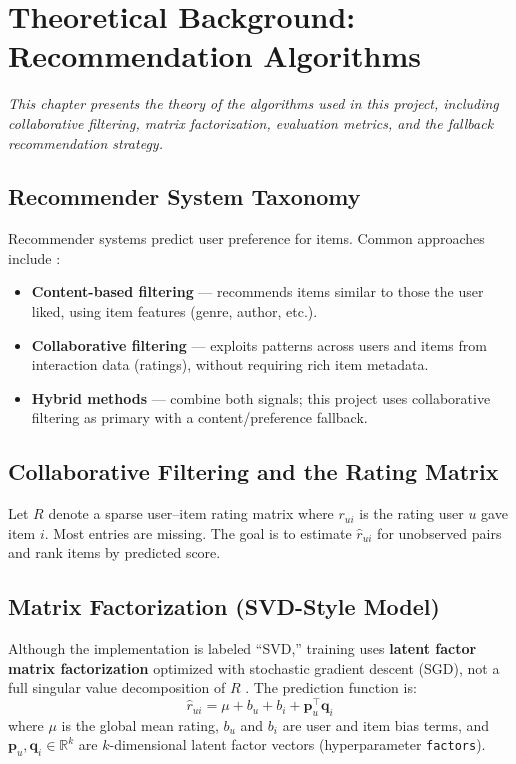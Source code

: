 \documentclass[12pt,a4paper]{report}
\newcommand{\chapterdesc}[1]{%
    \vspace{-0.6\baselineskip}
    \noindent\hspace*{1.5cm}\parbox{\dimexpr\textwidth-1.5cm\relax}{\textit{#1}}
    \par\vspace{0.3\baselineskip}
}
\begin{document}
\chapter{Theoretical Background: Recommendation Algorithms}
\chapterdesc{This chapter presents the theory of the algorithms used in this project, including collaborative filtering, matrix factorization, evaluation metrics, and the fallback recommendation strategy.}

\section{Recommender System Taxonomy}

Recommender systems predict user preference for items. Common approaches include \cite{recommender_systems_handbook}:
\begin{itemize}
    \item \textbf{Content-based filtering} --- recommends items similar to those the user liked, using item features (genre, author, etc.).
    \item \textbf{Collaborative filtering} --- exploits patterns across users and items from interaction data (ratings), without requiring rich item metadata.
    \item \textbf{Hybrid methods} --- combine both signals; this project uses collaborative filtering as primary with a content/preference fallback.
\end{itemize}

\section{Collaborative Filtering and the Rating Matrix}

Let $R$ denote a sparse user--item rating matrix where $r_{ui}$ is the rating user $u$ gave item $i$. Most entries are missing. The goal is to estimate $\hat{r}_{ui}$ for unobserved pairs and rank items by predicted score.

\section{Matrix Factorization (SVD-Style Model)}

Although the implementation is labeled ``SVD,'' training uses \textbf{latent factor matrix factorization} optimized with stochastic gradient descent (SGD), not a full singular value decomposition of $R$ \cite{matrix_factorization}. The prediction function is:
\begin{equation}
\hat{r}_{ui} = \mu + b_u + b_i + \mathbf{p}_u^\top \mathbf{q}_i
\label{eq:pred}
\end{equation}
where $\mu$ is the global mean rating, $b_u$ and $b_i$ are user and item bias terms, and $\mathbf{p}_u, \mathbf{q}_i \in \mathbb{R}^k$ are $k$-dimensional latent factor vectors (hyperparameter \texttt{factors}).
\end{document}
